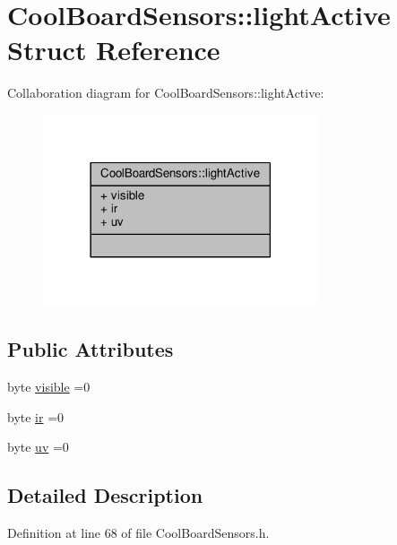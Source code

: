 \hypertarget{struct_cool_board_sensors_1_1light_active}{}\section{Cool\+Board\+Sensors\+:\+:light\+Active Struct Reference}
\label{struct_cool_board_sensors_1_1light_active}


Collaboration diagram for Cool\+Board\+Sensors\+:\+:light\+Active\+:\nopagebreak
\begin{figure}[H]
\begin{center}
\leavevmode
\includegraphics[width=230pt]{de/d9f/struct_cool_board_sensors_1_1light_active__coll__graph}
\end{center}
\end{figure}
\subsection*{Public Attributes}
\begin{DoxyCompactItemize}
\item 
byte \hyperlink{struct_cool_board_sensors_1_1light_active_abcbba296b6a95e67c0cd2555d9dd50c7}{visible} =0
\item 
byte \hyperlink{struct_cool_board_sensors_1_1light_active_a67700895349b95ceb263f1a6da756315}{ir} =0
\item 
byte \hyperlink{struct_cool_board_sensors_1_1light_active_a949a7aaf5166d981de8fe0fd93da20d6}{uv} =0
\end{DoxyCompactItemize}


\subsection{Detailed Description}


Definition at line 68 of file Cool\+Board\+Sensors.\+h.



